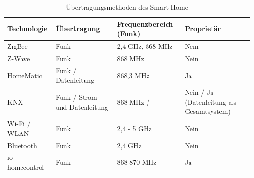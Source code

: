 \begin{table}[hbt!]
    \begin{center}
        \begin{tabular}{| p{3.25cm} | p{3.25cm} | p{3.25cm} | p{3.25cm} |}
            \hline
                \textbf{Technologie} & \textbf{Übertragung} & \textbf{Frequenzbereich (Funk)} & \textbf{Proprietär} \\
            \hline
                ZigBee & Funk & 2,4 GHz, 868 MHz & Nein \\ 
            \hline
                Z-Wave & Funk & 868 MHz & Nein \\ 
            \hline
                HomeMatic & Funk / Datenleitung & 868,3 MHz & Ja \\
            \hline
                KNX & Funk / Strom- und Datenleitung & 868 MHz / - & Nein / Ja (Datenleitung als Gesamtsystem) \\
            \hline
                Wi-Fi / WLAN & Funk & 2,4 - 5 GHz & Nein \\
            \hline 
                Bluetooth & Funk & 2,4 GHz & Nein \\
            \hline
                io-homecontrol & Funk & 868-870 MHz & Ja \\
            \hline
        \end{tabular}
    \end{center}
    \caption{Übertragungsmethoden des Smart Home}
    \label{tab:protocolsSH}
\end{table}

